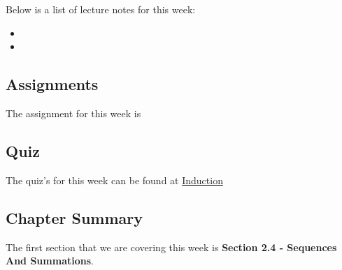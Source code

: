 \noindent Below is a list of lecture notes for this week:

\begin{itemize}
    \item {}
    \item {}
\end{itemize}

\subsection{Assignments}

The assignment for this week is   

\subsection{Quiz}

The quiz's for this week can be found at \href{https://applied.cs.colorado.edu/mod/quiz/view.php?id=51773}{Induction} \textbullet {}  

\subsection{Chapter Summary}

The first section that we are covering this week is \textbf{Section 2.4 - Sequences And Summations}.


